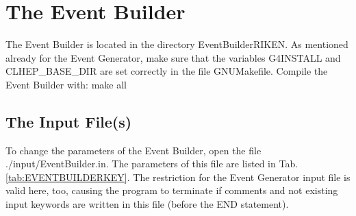 \documentclass[12pt]{book}
\begin{document}
\chapter{The Event Builder}

The Event Builder is located in the directory {\ttfamily EventBuilderRIKEN}. As mentioned already for the 
Event Generator, make sure that the variables {\ttfamily G4INSTALL}
and {\ttfamily CLHEP\_BASE\_DIR} are set correctly in the file {\ttfamily GNUMakefile}.
Compile the Event Builder with:\hfill{}
\linebreak
\linebreak
{\ttfamily make all}
\linebreak
\linebreak

\section{The Input File(s)}

To change the parameters of the Event Builder, open the file 
{\ttfamily ./input/EventBuilder.in}. The 
parameters of this file are listed in Tab.\ref{tab:EVENTBUILDERKEY}.
The restriction for the Event Generator input file is valid here, too, causing 
the program to terminate if 
comments and not existing input keywords are written in this file (before the END statement).
\end{document}

